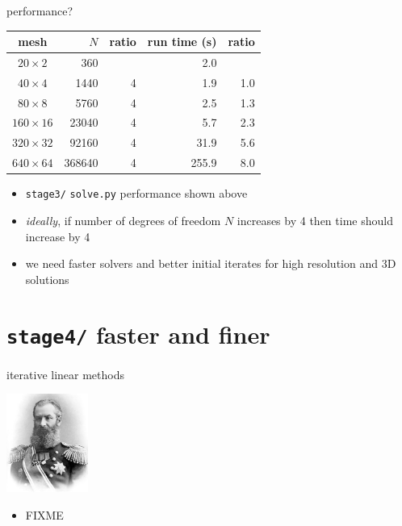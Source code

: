 \documentclass[10pt,hyperref,dvipsnames]{beamer}
\begin{document}
\begin{frame}{performance?}

\begin{center}
\begin{tabular}{c|rr|rr}
mesh           &   $N$ & ratio & run time (s)  & ratio \\ \hline
$20\times 2$   &    360 &       &          2.0 &       \\
$40\times 4$   &   1440 &     4 &          1.9 &   1.0 \\
$80\times 8$   &   5760 &     4 &          2.5 &   1.3 \\
$160\times 16$ &  23040 &     4 &          5.7 &   2.3 \\
$320\times 32$ &  92160 &     4 &         31.9 &   5.6 \\
$640\times 64$ & 368640 &     4 &        255.9 &   8.0
\end{tabular}
\end{center}

\begin{itemize}
\item \texttt{stage3/} \texttt{solve.py} performance shown above
\item \emph{ideally}, if number of degrees of freedom $N$ increases by 4 then time should increase by 4
\item \alert{we need faster solvers and better initial iterates for high resolution and 3D solutions}
\end{itemize}
\end{frame}



\section{\texttt{stage4/} \qquad faster and finer}

\begin{frame}{iterative linear methods}

\hfill \includegraphics[width=0.2\textwidth]{figs/people/akrylov.jpg}

\vspace{-20mm}
\begin{itemize}
\item FIXME
\end{itemize}
\end{frame}
\end{document}
